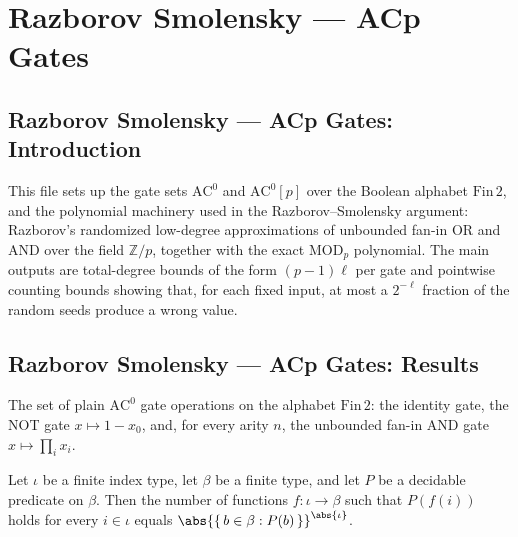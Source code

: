\section{Razborov Smolensky --- ACp Gates}
\subsection*{Razborov Smolensky --- ACp Gates: Introduction}

This file sets up the gate sets $\mathrm{AC}^0$ and $\mathrm{AC}^0[p]$ over the Boolean
alphabet $\mathrm{Fin}\,2$, and the polynomial machinery used in the Razborov--Smolensky
argument: Razborov's randomized low-degree approximations of unbounded fan-in $\mathrm{OR}$
and $\mathrm{AND}$ over the field $\mathbb{Z}/p$, together with the exact $\mathrm{MOD}_p$
polynomial. The main outputs are total-degree bounds of the form $(p-1)\ell$ per gate and
pointwise counting bounds showing that, for each fixed input, at most a $2^{-\ell}$
fraction of the random seeds produce a wrong value.

\subsection*{Razborov Smolensky --- ACp Gates: Results}

\begin{definition}
\label{BoolCircuit.stdGateOps}
\leanok
{}
The set of plain $\mathrm{AC}^0$ gate operations on the alphabet $\mathrm{Fin}\,2$: the
identity gate, the NOT gate $x \mapsto 1 - x_0$, and, for every arity $n$, the unbounded
fan-in AND gate $x \mapsto \prod_{i} x_i$.
\end{definition}

\begin{lemma}
\label{RazborovSmolensky.tuple_fail_count}
\leanok
{}
Let $\iota$ be a finite index type, let $\beta$ be a finite type, and let $P$ be a
decidable predicate on $\beta$. Then the number of functions $f : \iota \to \beta$ such
that $P(f(i))$ holds for every $i \in \iota$ equals $\abs{\{\,b \in \beta :
P(b)\,\}}^{\abs{\iota}}$.
\end{lemma}

